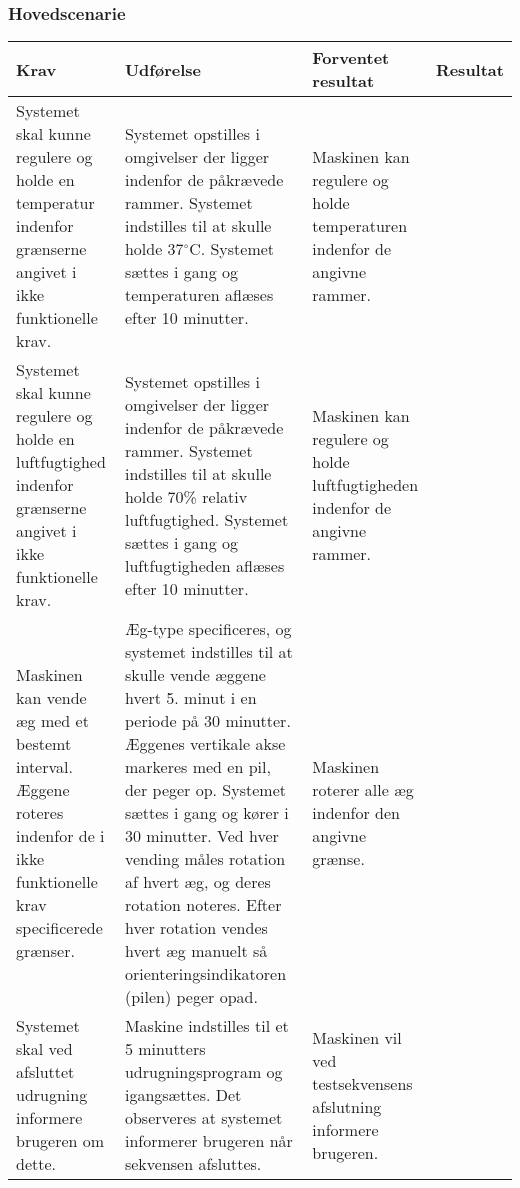  
 \subsubsection{Hovedscenarie}
\begin{center}

	\begin{longtable}{| p{3cm} | p{3cm} | p{3cm} | p{3cm} |}
		\hline
		Krav & Udførelse & Forventet resultat & Resultat \\ \hline
		
		
		Systemet skal kunne regulere og holde en temperatur indenfor grænserne angivet i ikke funktionelle krav.
		&Systemet opstilles i omgivelser der ligger indenfor de påkrævede rammer. Systemet indstilles til at skulle holde 37$^\circ$C. Systemet sættes i gang og temperaturen aflæses efter 10 minutter. 
		&Maskinen kan regulere og holde temperaturen indenfor de angivne rammer. 
		& \\ \hline
		
		Systemet skal kunne regulere og holde en luftfugtighed indenfor grænserne angivet i ikke funktionelle krav.
		&Systemet opstilles i omgivelser der ligger indenfor de påkrævede rammer. Systemet indstilles til at skulle holde 70\% relativ luftfugtighed. Systemet sættes i gang og luftfugtigheden aflæses efter 10 minutter.
		&Maskinen kan regulere og holde luftfugtigheden indenfor de angivne rammer.
		& \\ \hline
		
		Maskinen kan vende æg med et bestemt interval. Æggene roteres indenfor de i ikke funktionelle krav specificerede grænser.
		&Æg-type specificeres, og systemet indstilles til at skulle vende æggene hvert 5. minut i en periode på 30 minutter. Æggenes vertikale akse markeres med en pil, der peger op. Systemet sættes i gang og kører i 30 minutter. Ved hver vending måles rotation af hvert æg, og deres rotation noteres. Efter hver rotation vendes hvert æg manuelt så orienteringsindikatoren (pilen) peger opad. 
		&Maskinen roterer alle æg indenfor den angivne grænse.
		& \\ \hline		
		
		Systemet skal ved afsluttet udrugning informere brugeren om dette.
		&Maskine indstilles til et 5 minutters udrugningsprogram og igangsættes. Det observeres at systemet informerer brugeren når sekvensen afsluttes.
		&Maskinen vil ved testsekvensens afslutning informere brugeren.
		& \\ \hline

		
		
	\end{longtable}
\end{center}
\clearpage
